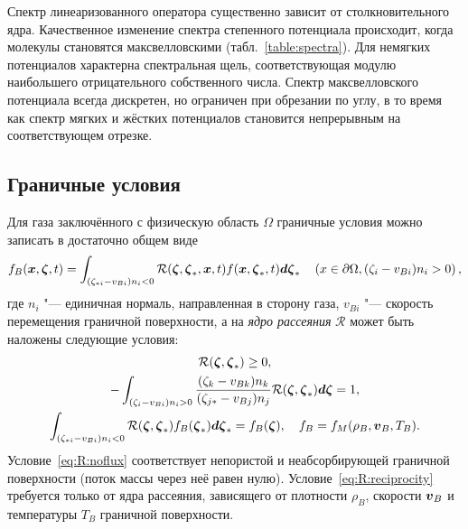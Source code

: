 Спектр линеаризованного оператора существенно зависит от столкновительного ядра.
Качественное изменение спектра степенного потенциала происходит, когда молекулы становятся максвелловскими (табл.~\ref{table:spectra}).
Для немягких потенциалов характерна спектральная щель, соответствующая модулю наибольшего отрицательного собственного числа.
Спектр максвелловского потенциала всегда дискретен, но ограничен при обрезании по углу,
в то время как спектр мягких и жёстких потенциалов становится непрерывным на соответствующем отрезке.

\subsection{Граничные условия}

Для газа заключённого с физическую область \(\Omega\) граничные условия можно записать в достаточно общем виде
\begin{equation}\label{eq:scatterring_kernel}
    f_B({\boldsymbol{x}},{\boldsymbol{\zeta}},t) = \int_{(\zeta_{*i}-v_{Bi})n_i<0} \mathcal{R}({\boldsymbol{\zeta}},{\boldsymbol{\zeta}}_*,{\boldsymbol{x}},t)f({\boldsymbol{x}},{\boldsymbol{\zeta}}_*,t)\boldsymbol{d\zeta}_*
    \quad \left( x\in\partial\Omega, (\zeta_i-v_{Bi})n_i>0 \right),
\end{equation}
где \(n_i\) "--- единичная нормаль, направленная в сторону газа,
\(v_{Bi}\) "--- скорость перемещения граничной поверхности,
а на \emph{ядро рассеяния} \(\mathcal{R}\) может быть наложены следующие условия:
\begin{gather}
    \mathcal{R}({\boldsymbol{\zeta}},{\boldsymbol{\zeta}}_*) \geq 0, \label{eq:R:positivity}\\
    -\int_{(\zeta_i-v_{Bi})n_i>0} \frac{(\zeta_k-v_{Bk})n_k}{(\zeta_{j*}-v_{Bj})n_j}
        \mathcal{R}({\boldsymbol{\zeta}},{\boldsymbol{\zeta}}_*)\boldsymbol{d\zeta} = 1, \label{eq:R:noflux}\\
    \int_{(\zeta_{*i}-v_{Bi})n_i<0} \mathcal{R}({\boldsymbol{\zeta}},{\boldsymbol{\zeta}}_*)f_B({\boldsymbol{\zeta}}_*)\boldsymbol{d\zeta}_* = f_B({\boldsymbol{\zeta}}),
        \quad f_B = f_M(\rho_B, {\boldsymbol{v}}_B, T_B). \label{eq:R:reciprocity}
\end{gather}
Условие~\eqref{eq:R:noflux} соответствует непористой и неабсорбирующей граничной поверхности
(поток массы через неё равен нулю).
Условие~\eqref{eq:R:reciprocity} требуется только от ядра рассеяния,
зависящего от плотности \(\rho_B\), скорости \({\boldsymbol{v}}_B\) и температуры \(T_B\) граничной поверхности.


